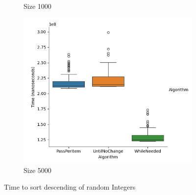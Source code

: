 \documentclass{article}
\begin{document}
\begin{figure}[ht]
\begin{subfigure}{0.3\textwidth}
    \caption{Size 1000}
    \label{fig:img2}
  \end{subfigure}
  \begin{subfigure}{0.3\textwidth}
    \centering
    \includegraphics[width=\linewidth]{../figureIntDesc5000.png}
    \caption{Size 5000}
    \label{fig:img3}
  \end{subfigure}
  \caption{Time to sort descending of random Integers}
  \label{fig:three_images}
\end{figure}
\end{document}
